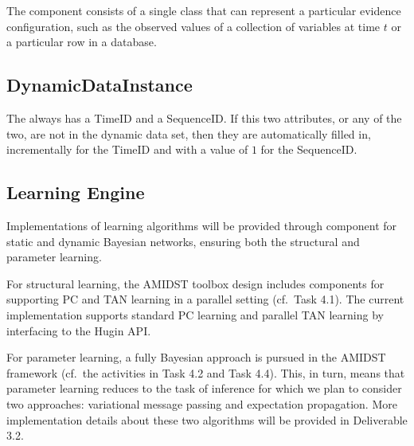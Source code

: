 The  component consists of a single class that can represent a particular evidence configuration, such as the observed values of a collection of variables at time $t$ or a particular row in a database. 

  
\subsection{DynamicDataInstance}

The  always has a TimeID and a SequenceID. If this two attributes, or any of the two, are not in the dynamic data set, then they are automatically filled in, incrementally for the TimeID and with a value of $1$ for the SequenceID.

\subsection{Learning Engine}

Implementations of learning algorithms will be provided through  component for static and dynamic Bayesian networks, ensuring both the structural and parameter learning.

For structural learning, the AMIDST toolbox design includes components for supporting PC and TAN learning in a parallel setting (cf.\ Task 4.1). The current implementation supports standard PC learning and parallel TAN learning by interfacing to the Hugin API. 

For parameter learning, a fully Bayesian approach is pursued in the AMIDST framework (cf.\ the activities in Task 4.2 and Task 4.4). This, in turn, means that parameter learning reduces to the task of inference for which we plan to consider two approaches: variational message passing and expectation propagation. More implementation details about these two algorithms will be provided in Deliverable 3.2. 
 
